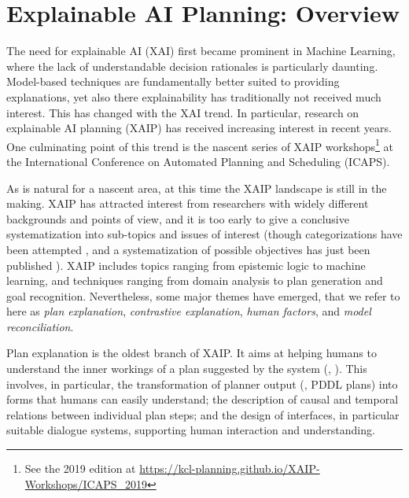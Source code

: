 \section{Explainable AI Planning: Overview}
\label{xaip}


The need for explainable AI (XAI) first became prominent in Machine
Learning, where the lack of understandable decision rationales is
particularly daunting. Model-based techniques are fundamentally better
suited to providing explanations, yet also there explainability has
traditionally not received much interest. This has changed with the
XAI trend. In particular, research on explainable AI planning (XAIP)
has received increasing interest in recent years. One culminating
point of this trend is the nascent series of XAIP
workshops\footnote{See the 2019 edition at
  \url{https://kcl-planning.github.io/XAIP-Workshops/ICAPS_2019}} at
the International Conference on Automated Planning and Scheduling
(ICAPS).

As is natural for a nascent area, at this time the XAIP landscape is
still in the making. XAIP has attracted interest from researchers with
widely different backgrounds and points of view, and it is too early
to give a conclusive systematization into sub-topics and issues of
interest (though categorizations have been attempted
\cite{langley:etal:aaai-17}, and a systematization of possible
objectives has just been published \cite{chakraborti:icaps-19}). XAIP
includes topics ranging from epistemic logic to machine learning, and
techniques ranging from domain analysis to plan generation and goal
recognition. Nevertheless, some major themes have emerged, that we
refer to here as \emph{plan explanation}, \emph{contrastive
  explanation}, \emph{human factors}, and \emph{model reconciliation}.

Plan explanation is the oldest branch of XAIP. It aims at helping
humans to understand the inner workings of a plan suggested by the
system (\eg,
\cite{mcguiness:etal:flairs-07,khan:etal:icaps-09,bidot:etal:mkwi-10,sohrabi:etal:aaai-11,seegebarth:etal:icaps-12,bercher:etal:icaps-14,nothdurft:etal:sigdal-15}). This
involves, in particular, the transformation of planner output (\eg,
PDDL plans) into forms that humans can easily understand; the
description of causal and temporal relations between individual plan
steps; and the design of interfaces, in particular suitable dialogue
systems, supporting human interaction and understanding.


